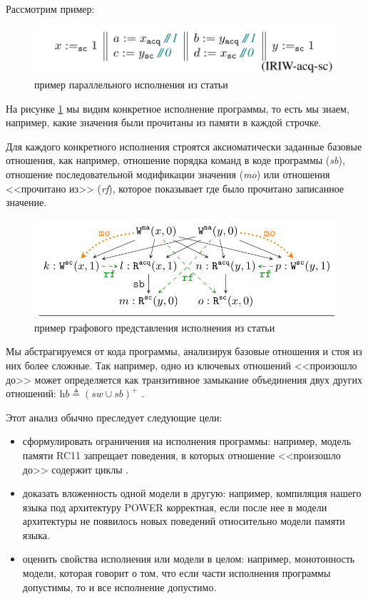 \documentclass[times
              ]{itmo-student-thesis}
\begin{document}
  Рассмотрим пример:
  \begin{figure}[!h]
    \centering
    \includegraphics[width=0.7\linewidth]{pics/pic1.png}
    \caption{пример параллельного исполнения из статьи \cite{rc11}}
    \label{fig:pic1}
  \end{figure}

  На рисунке \ref{fig:pic1} мы видим конкретное исполнение программы, то есть мы знаем, например, какие
  значения были прочитаны из памяти в каждой строчке.

  Для каждого конкретного исполнения строятся аксиоматически заданные базовые отношения, как например,
  отношение порядка команд в коде программы (\textit{sb}), отношение последовательной модификации
  значения (\textit{mo}) или отношения <<прочитано из>> (\textit{rf}), которое показывает где было
  прочитано записанное значение.

  \begin{figure}[!h]
    \centering
    \includegraphics[width=0.7\linewidth]{pics/pic2.png}
    \caption{пример графового представления исполнения из статьи \cite{rc11}}
    \label{fig:pic2}
  \end{figure}

  Мы абстрагируемся от кода программы, анализируя базовые отношения и стоя из них более сложные. Так
  например, одно из ключевых отношений <<произошло до>> может определяется как транзитивное замыкание
  объединения двух других отношений: $ \textit{hb} \triangleq (\textit{sw} \cup \textit{sb})^+ $ \cite{rc11}.

  Этот анализ обычно преследует следующие цели:
  \begin{itemize}
    \item сформулировать ограничения на исполнения программы:
    например, модель памяти RC11 запрещает поведения, в которых отношение <<произошло до>> содержит
    циклы \cite{rc11}.
    \item доказать вложенность одной модели в другую:
    например, компиляция нашего языка под архитектуру POWER корректная, если после нее в модели
    архитектуры\cite{axiomatic_memory_model_for_power_mp} не появилось новых поведений относительно
    модели памяти языка.
    \item оценить свойства исполнения или модели в целом:
    например, монотонность модели, которая говорит о том, что если части исполнения программы
    допустимы, то и все исполнение допустимо.

  \end{itemize}
\end{document}
